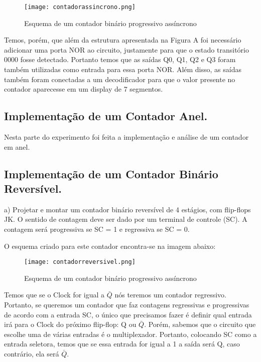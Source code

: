 \documentclass[12pt]{article}
\begin{document}
	\begin{figure}[H]
		\centering
		\texttt{[image: contadorassincrono.png]}
		\caption{Esquema de um contador binário progressivo assíncrono}
		\label{fig:contadorassincrono}
	\end{figure}
	
	Temos, porém, que além da estrutura apresentada na Figura A foi necessário adicionar uma porta NOR ao circuito, justamente para que o estado transitório 0000 fosse detectado. Portanto temos que as saídas Q0, Q1, Q2 e Q3 foram também utilizadas como entrada para essa porta NOR. Além disso, as saídas também foram conectadas a um decodificador para que o valor presente no contador aparecesse em um display de 7 segmentos.

	
	\subsection{Implementação de um Contador Anel.}
	\label{2.3}
	
	Nesta parte do experimento foi feita a implementação e análise de um contador em anel.
	
	

	\subsection{Implementação de um Contador Binário Reversível.}
	\label{2.4}
	
	a) Projetar e montar um contador binário reversível de 4 estágios, com flip-flops JK. O sentido de contagem deve ser dado por um terminal de controle (SC). A contagem será progressiva se SC = 1 e regressiva se SC = 0.
	
	O esquema criado para este contador encontra-se na imagem abaixo:
	
	\begin{figure}[H]
		\centering
		\texttt{[image: contadorreversivel.png]}
		\caption{Esquema de um contador binário progressivo assíncrono}
		\label{fig:Esquema de um contador binário reversível}
	\end{figure}
	
	Temos que se o Clock for igual a $\bar{Q}$ nós teremos um contador regressivo. Portanto, se queremos um contador que faz contagens regressivas e progressivas de acordo com a entrada SC, o único que precisamos fazer é definir qual entrada irá para o Clock do próximo flip-flop: Q ou $\bar{Q}$. Porém, sabemos que o circuito que escolhe uma de várias entradas é o multiplexador. Portanto, colocando SC como a entrada seletora, temos que se essa entrada for igual a 1 a saída será Q, caso contrário, ela será $\bar{Q}$. 
	
\end{document}
